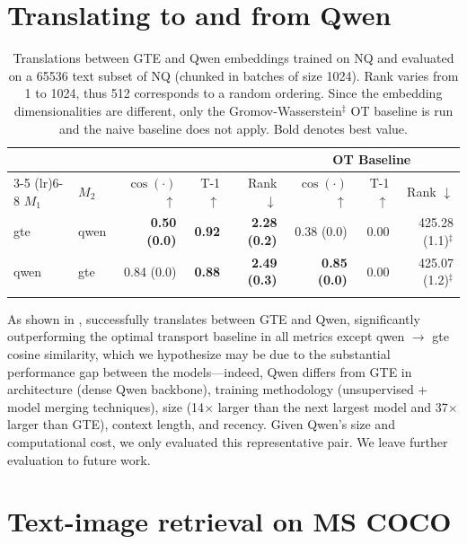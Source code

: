 \section{Translating to and from Qwen}
\label{sec:qwen}
\begin{table}[!h]
    \scriptsize
    \centering
    \begin{tabular}{llrrrrrr}
        \toprule
        \multicolumn{2}{c}{} & \multicolumn{3}{c}{\atk{}} & \multicolumn{3}{c}{OT Baseline}\\
        \cmidrule(lr){3-5} \cmidrule(lr){6-8}
        $M_1$ & $M_2$ & $\cos(\cdot)$ $\uparrow$ & T-1 $\uparrow$ & Rank $\downarrow$& $\cos(\cdot)$ $\uparrow$ & T-1 $\uparrow$ & Rank $\downarrow$\\
        \midrule
        gte & qwen & \textbf{0.50 {\tiny (0.0)}} & \textbf{0.92} & \textbf{2.28 {\tiny (0.2)}} & 0.38 {\tiny (0.0)} & 0.00 & 425.28 {\tiny (1.1)}$^{\ddagger}$ \\
        qwen & gte & 0.84 {\tiny (0.0)} & \textbf{0.88} & \textbf{2.49 {\tiny (0.3)}} & \textbf{0.85 {\tiny (0.0)}} & 0.00 & 425.07 {\tiny (1.2)}$^{\ddagger}$ \\
        \bottomrule\\[-1.6ex]
    \end{tabular}
    \caption{Translations between GTE and Qwen embeddings trained on NQ and evaluated on a 65536 text subset of NQ (chunked in batches of size 1024). Rank varies from 1 to 1024, thus 512 corresponds to a random ordering. Since the embedding dimensionalities are different, only the Gromov-Wasserstein$^{\ddagger}$ OT baseline is run and the naive baseline does not apply. Bold denotes best value.}
    \label{tab:qwen_nq}
\end{table} 

As shown in , \atk{} successfully translates between GTE and Qwen, significantly outperforming the optimal transport baseline in all metrics except qwen $\to$ gte cosine similarity, which we hypothesize may be due to the substantial performance gap between the models---indeed, Qwen differs from GTE in architecture (dense Qwen backbone), training methodology (unsupervised + model merging techniques), size (14$\times$ larger than the next largest model and 37$\times$ larger than GTE), context length, and recency. Given Qwen's size and computational cost, we only evaluated this representative pair. We leave further evaluation to future work.


\section{Text-image retrieval on MS COCO}
\label{sec:mscoco}

